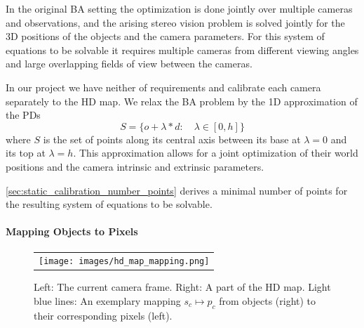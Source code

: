 In the original BA setting the optimization is done jointly over multiple cameras and observations, and the arising stereo vision problem is solved jointly for the 3D positions of the objects and the camera parameters.
For this system of equations to be solvable it requires multiple cameras from different viewing angles and large overlapping fields of view between the cameras.

In our project we have neither of requirements and calibrate each camera separately to the HD map.
We relax the BA problem by the 1D approximation of the PDs
\begin{equation}
S = \{o + \lambda * d: \quad \lambda \in [0, h]\}
\end{equation}
where $S$ is the set of points along its central axis between its base at $\lambda = 0$ and its top at $\lambda = h$.
This approximation allows for a joint optimization of their world positions and the camera intrinsic and extrinsic parameters.

\autoref{sec:static_calibration_number_points} derives a minimal number of points for the resulting system of equations to be solvable.




\paragraph{Mapping Objects to Pixels}
\begin{figure}[t]
  \centering
  \begin{tabular}{c}
     \texttt{[image: images/hd\_map\_mapping.png]}
    \end{tabular}
    \caption{
       Left: The current camera frame. 
       Right: A part of the HD map.
       Light blue lines: An exemplary mapping $s_c \mapsto p_c$ from objects (right) to their corresponding pixels (left).
       }
  \label{fig:static_calibration_mapping}
  \end{figure}


